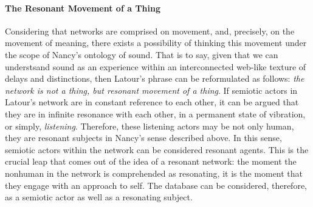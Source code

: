 \paragraph{The Resonant Movement of a Thing}
Considering that networks are comprised on movement, and, precisely, on the movement of meaning, there exists a possibility of thinking this movement under the scope of Nancy's ontology of sound. That is to say, given that we can understsand sound as an experience within an interconnected web-like texture of delays and distinctions, then Latour's phrase can be reformulated as follows: \textit{the network is not a thing, but resonant movement of a thing}. If semiotic actors in Latour's network are in constant reference to each other, it can be argued that they are in infinite resonance with each other, in a permanent state of vibration, or simply, \textit{listening}. Therefore, these listening actors may be not only human, they are resonant subjects in Nancy's sense described above. In this sense, semiotic actors within the network can be considered resonant agents. This is the crucial leap that comes out of the idea of a resonant network: the moment the nonhuman in the network is comprehended as resonating, it is the moment that they engage with an approach to self. The database can be considered, therefore, as a semiotic actor as well as a resonating subject. 













